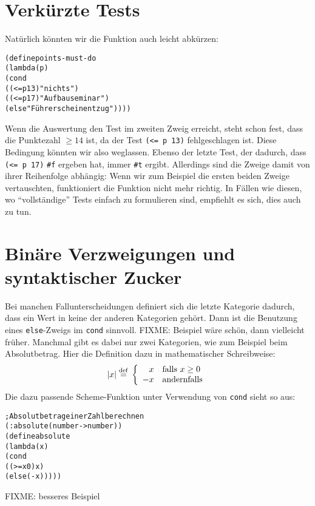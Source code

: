 \section{Verkürzte Tests}

Natürlich könnten wir die Funktion auch leicht abkürzen:
%
\begin{alltt}
(define points-must-do
  (lambda (p)
    (cond
      ((<= p 13) "nichts")
      ((<= p 17) "Aufbauseminar")
      (else "Führerscheinentzug"))))
\end{alltt}
%
Wenn die Auswertung den Test im zweiten Zweig erreicht, steht schon
fest, dass die Punktezahl $\geq 14$ ist, da der Test \verb|(<= p 13)|
fehlgeschlagen ist.  Diese Bedingung könnten wir also weglassen.
Ebenso der letzte Test, der dadurch, dass \verb|(<= p 17)| \verb|#f|
ergeben hat, immer \verb|#t| ergibt.  Allerdings sind die Zweige damit
von ihrer Reihenfolge abhängig: Wenn wir zum Beispiel die ersten
beiden Zweige vertauschten, funktioniert die Funktion nicht mehr
richtig.  In Fällen wie diesen, wo "`vollständige"' Tests einfach zu
formulieren sind, empfiehlt es sich, dies auch zu tun.

\begin{mantra}\label{mantra:comprehensive-tests}
  
\end{mantra}

\section{Binäre Verzweigungen und syntaktischer Zucker}
\label{sec:binaere-verzweigungen}

Bei manchen Fallunterscheidungen definiert sich die letzte Kategorie
dadurch, dass ein Wert in keine der anderen Kategorien gehört.  Dann
ist die Benutzung eines \texttt{else}-Zweigs im \texttt{cond}
sinnvoll.
FIXME: Beispiel wäre schön, dann vielleicht früher.  
Manchmal gibt es dabei nur zwei Kategorien, wie
zum Beispiel beim Absolutbetrag.  Hier die Definition dazu in mathematischer
Schreibweise:
%
\begin{displaymath}
  |x| \stackrel{\rm def}{=}{} \left\{\begin{array}{rl}
      x & \textrm{falls } x \geq 0\\
      -x & \textrm{andernfalls}
    \end{array}
    \right.
\end{displaymath}
%
Die dazu passende Scheme-Funktion unter Verwendung von \texttt{cond}
sieht so aus:
%
\begin{alltt}
; Absolutbetrag einer Zahl berechnen
(: absolute (number -> number))
(define absolute
  (lambda (x)
    (cond
     ((>= x 0) x)
     (else (- x)))))
\end{alltt}
FIXME: besseres Beispiel

